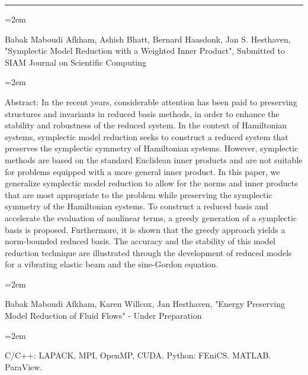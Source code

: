 \documentclass{scrartcl}
\newcommand{\MarginText}[1]{\marginpar{\raggedleft\itshape\small#1}} %
\newcommand{\Description}[1]{\hangindent=2em\hangafter=0\noindent\raggedright\footnotesize{#1}\par\normalsize\vspace{1em}} %
\begin{document}
\begin{cv}{}
\noindent\rule{12cm}{0.4pt}
\vspace{1cm}

\Description{\MarginText{2018}Babak Maboudi Afkham, Ashish Bhatt, Bernard Haasdonk, Jan S. Hesthaven, "Symplectic Model Reduction with a Weighted Inner Product", Submitted to SIAM Journal on Scientific Computing}

\Description{Abstract: In the recent years, considerable attention has been paid to preserving structures and invariants in reduced basis methods, in order to enhance the stability and robustness of the reduced system. In the context of Hamiltonian systems, symplectic model reduction seeks to construct a reduced system that preserves the symplectic symmetry of Hamiltonian systems. However, symplectic methods are based on the standard Euclidean inner products and are not suitable for problems equipped with a more general inner product. In this paper, we generalize symplectic model reduction to allow for the norms and inner products that are most appropriate to the problem while preserving the symplectic symmetry of the Hamiltonian systems. To construct a reduced basis and accelerate the evaluation of nonlinear terms, a greedy generation of a symplectic basis is proposed. Furthermore, it is shown that the greedy approach yields a norm-bounded reduced basis. The accuracy and the stability of this model reduction technique are illustrated through the development of reduced models for a vibrating elastic beam and the sine-Gordon equation.}

\Description{\MarginText{2018}Babak Maboudi Afkham, Karen Willcox, Jan Hesthaven, "Energy Preserving Model Reduction of Fluid Flows" - Under Preparation }

\newpage




\vspace{1em}

\Description{C/C++: LAPACK, MPI, OpenMP, CUDA. Python: FEniCS. MATLAB. ParaView.}



\end{cv}
\end{document}
